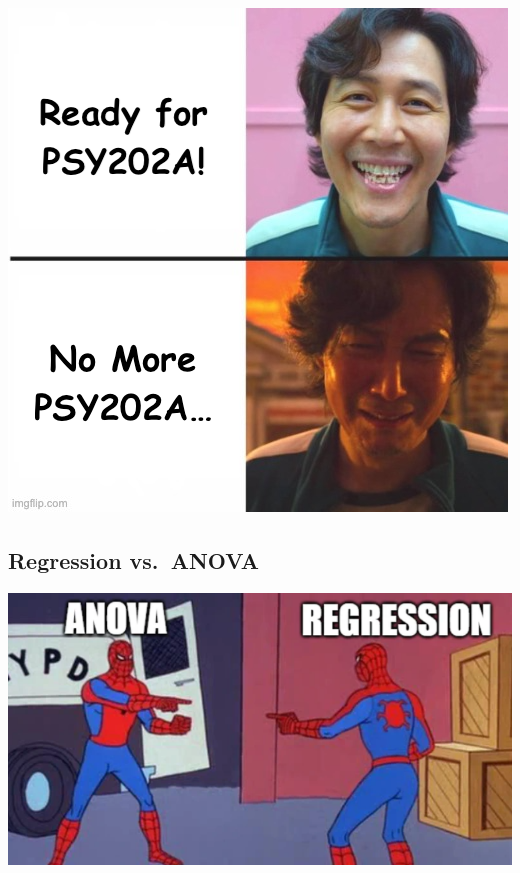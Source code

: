 \documentclass[
]{book}
\begin{document}
\includegraphics{./img/nopsy202a.png}

\subsection{Regression vs.~ANOVA}\label{regression-vs.-anova}

\includegraphics{./img/regression_anova_meme.png}
\end{document}
